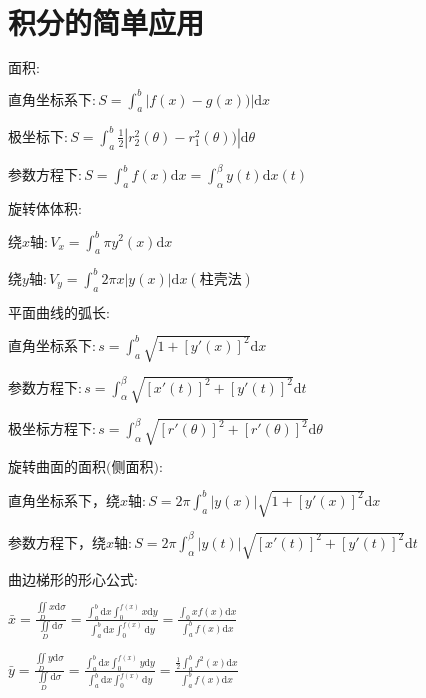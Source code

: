 \section{积分的简单应用}

\begin{spacing}{\hangju}
    \noindent $\mbox{面积}\colon$

    $\mbox{直角坐标系下}\colon S = \int_{a}^{b}{|f(x) - g(x))|\mathrm{d}x}$

    $\mbox{极坐标下}\colon S = \int_{a}^{b}{\frac{1}{2}|r_{2}^{2}(\theta) - r_{1}^{2}(\theta))|\mathrm{d}\theta}$

    $\mbox{参数方程下}\colon S = \int_{a}^{b}{f(x)\mathrm{d}x} =\int_{\alpha}^{\beta}{y(t)\mathrm{d}x(t)}$

    \noindent $\mbox{旋转体体积}\colon$

    $\mbox{绕}x\mbox{轴}\colon V_{x} = \int_{a}^{b}{\pi y^2(x)\mathrm{d}x}$

    $\mbox{绕}y\mbox{轴}\colon V_{y} = \int_{a}^{b}{2\pi x|y(x)|\mathrm{d}x}(\mbox{柱壳法})$

    \noindent $\mbox{平面曲线的弧长}\colon$

    $\mbox{直角坐标系下}\colon s = \int_{a}^{b}{\sqrt{1 + [y'(x)]^2}\mathrm{d}x}$

    $\mbox{参数方程下}\colon s = \int_{\alpha}^{\beta}{\sqrt{[x'(t)]^2 + [y'(t)]^2}\mathrm{d}t}$

    $\mbox{极坐标方程下}\colon s = \int_{\alpha}^{\beta}{\sqrt{[r'(\theta)]^2 + [r'(\theta)]^2}\mathrm{d}\theta}$

    \noindent $\mbox{旋转曲面的面积(侧面积)}\colon$

    $\mbox{直角坐标系下，绕}x\mbox{轴}\colon S = 2\pi\int_{a}^{b}{|y(x)|\sqrt{1 + [y'(x)]^2}\mathrm{d}x}$

    $\mbox{参数方程下，绕}x\mbox{轴}\colon S = 2\pi\int_{\alpha}^{\beta}{|y(t)|\sqrt{[x'(t)]^2 + [y'(t)]^2}\mathrm{d}t}$

    \noindent $\mbox{曲边梯形的形心公式}\colon$

    $\bar{x} = \frac{\iint\limits_D{x\mathrm{d}\sigma}}{\iint\limits_D{\mathrm{d}\sigma}} = \frac{\int_{a}^{b}{\mathrm{d}x}\int_{0}^{f(x)}{x\mathrm{d}y}}{\int_{a}^{b}{\mathrm{d}x}\int_{0}^{f(x)}{\mathrm{d}y}} = \frac{\int_{0}{xf(x)\mathrm{d}x}}{\int_{a}^{b}{f(x)\mathrm{d}x}}$

    $\bar{y} = \frac{\iint\limits_D{y\mathrm{d}\sigma}}{\iint\limits_D{\mathrm{d}\sigma}} = \frac{\int_{a}^{b}{\mathrm{d}x}\int_{0}^{f(x)}{y\mathrm{d}y}}{\int_{a}^{b}{\mathrm{d}x}\int_{0}^{f(x)}{\mathrm{d}y}} = \frac{\frac{1}{2}\int_{a}^{b}{f^{2}(x)\mathrm{d}x}}{\int_{a}^{b}{f(x)\mathrm{d}x}}$


\end{spacing}
